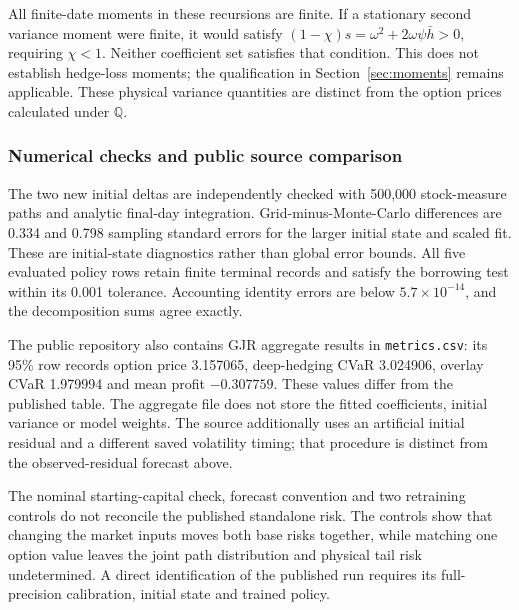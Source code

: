 \documentclass[11pt,a4paper]{article}
\newcommand{\Q}{\mathbb Q}
\theoremstyle{remark}
\begin{document}
All finite-date moments in these recursions are finite. If a stationary second variance moment were finite, it would satisfy $(1-\chi)s=\omega^2+2\omega\psi\bar h>0$, requiring $\chi<1$. Neither coefficient set satisfies that condition. This does not establish hedge-loss moments; the qualification in Section~\ref{sec:moments} remains applicable. These physical variance quantities are distinct from the option prices calculated under $\Q$.

\subsubsection{Numerical checks and public source comparison}
The two new initial deltas are independently checked with 500,000 stock-measure paths and analytic final-day integration. Grid-minus-Monte-Carlo differences are 0.334 and 0.798 sampling standard errors for the larger initial state and scaled fit. These are initial-state diagnostics rather than global error bounds. All five evaluated policy rows retain finite terminal records and satisfy the borrowing test within its 0.001 tolerance. Accounting identity errors are below $5.7\times10^{-14}$, and the decomposition sums agree exactly.

The public repository also contains GJR aggregate results in \texttt{metrics.csv}: its 95\% row records option price 3.157065, deep-hedging CVaR 3.024906, overlay CVaR 1.979994 and mean profit $-0.307759$. These values differ from the published table. The aggregate file does not store the fitted coefficients, initial variance or model weights. The source additionally uses an artificial initial residual and a different saved volatility timing; that procedure is distinct from the observed-residual forecast above.

The nominal starting-capital check, forecast convention and two retraining controls do not reconcile the published standalone risk. The controls show that changing the market inputs moves both base risks together, while matching one option value leaves the joint path distribution and physical tail risk undetermined. A direct identification of the published run requires its full-precision calibration, initial state and trained policy.
\end{document}
